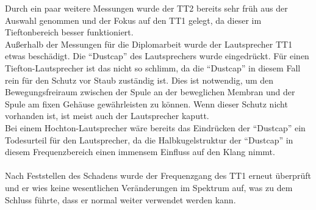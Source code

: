 \newpage
Durch ein paar weitere Messungen wurde der TT2 bereits sehr früh aus der Auswahl genommen und der Fokus auf den TT1 gelegt, da dieser im Tieftonbereich besser funktioniert.
\\
Außerhalb der Messungen für die Diplomarbeit wurde der Lautsprecher TT1 etwas beschädigt.
Die \enquote{Dustcap} des Lautsprechers wurde eingedrückt.
Für einen Tiefton-Lautsprecher ist das nicht so schlimm, da die \enquote{Dustcap} in diesem Fall rein für den Schutz vor Staub zuständig ist.
Dies ist notwendig, um den Bewegungsfreiraum zwischen der Spule an der beweglichen Membran und der Spule am fixen Gehäuse gewährleisten zu können.
Wenn dieser Schutz nicht vorhanden ist, ist meist auch der Lautsprecher kaputt.\\
Bei einem Hochton-Lautsprecher wäre bereits das Eindrücken der \enquote{Dustcap} ein Todesurteil für den Lautsprecher, da die Halbkugelstruktur der \enquote{Dustcap} in diesem Frequenzbereich einen immensem Einfluss auf den Klang nimmt.
\\ \\
Nach Feststellen des Schadens wurde der Frequenzgang des TT1 erneut überprüft und er wies keine wesentlichen Veränderungen im Spektrum auf, was zu dem Schluss führte, dass er normal weiter verwendet werden kann.
\\













